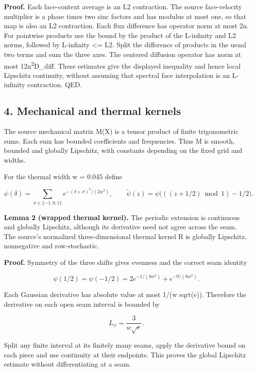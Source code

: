 \documentclass[11pt,a4paper]{article}
\begin{document}
\textbf{Proof.} Each face-context average is an L2 contraction. The source face-velocity multiplier is a phase times two sinc factors and has modulus at most one, so that map is also an L2 contraction. Each flux difference has operator norm at most 2n. For pointwise products use the bound by the product of the L-infinity and L2 norms, followed by L-infinity <= L2. Split the difference of products in the usual two terms and sum the three axes. The centered diffusion operator has norm at most 12n\textsuperscript{2}D\_diff. These estimates give the displayed inequality and hence local Lipschitz continuity, without assuming that spectral face interpolation is an L-infinity contraction. QED.

\subsection*{4. Mechanical and thermal kernels}

The source mechanical matrix M(X) is a tensor product of finite trigonometric sums. Each sum has bounded coefficients and frequencies. Thus M is smooth, bounded and globally Lipschitz, with constants depending on the fixed grid and widths.

For the thermal width w = 0.045 define



\[
\psi(\delta)=\sum_{\sigma\in\{-1,0,1\}}
e^{-(\delta+\sigma)^2/(2w^2)},\qquad
\widetilde\psi(z)=\psi\bigl(((z+1/2)\bmod1)-1/2\bigr).
\]



\textbf{Lemma 2 (wrapped thermal kernel).} The periodic extension is continuous and globally Lipschitz, although its derivative need not agree across the seam. The source's normalized three-dimensional thermal kernel R is globally Lipschitz, nonnegative and row-stochastic.

\textbf{Proof.} Symmetry of the three shifts gives evenness and the correct seam identity



\[
\psi(1/2)=\psi(-1/2)=2e^{-1/(8w^2)}+e^{-9/(8w^2)}.
\]



Each Gaussian derivative has absolute value at most 1/(w sqrt(e)). Therefore the derivative on each open seam interval is bounded by



\[
L_\psi=\frac{3}{w\sqrt e}.
\]



Split any finite interval at its finitely many seams, apply the derivative bound on each piece and use continuity at their endpoints. This proves the global Lipschitz estimate without differentiating at a seam.
\end{document}
